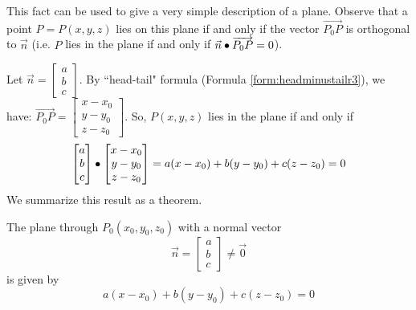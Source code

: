 \documentclass{ximera}
\begin{document}
 
This fact can be used to give a very simple description of a
plane.
 Observe that a point $P = P(x, y, z)$ lies on this plane if and only if the vector $\overrightarrow{P_{0}P}$ is orthogonal to $\vec{n}$ (i.e. $P$ lies in the plane if and only if $\vec{n} \bullet \overrightarrow{P_{0}P} = 0$).
  
 \begin{center}
           
\end{center}


  
Let $\vec{n}=\begin{bmatrix}a\\b\\c\end{bmatrix}$.  By ``head-tail" formula (Formula \ref{form:headminustailr3}), we have: $\overrightarrow{P_{0}P} = \begin{bmatrix}
x - x_{0}\\
y - y_{0}\\
z - z_{0}
\end{bmatrix}$. So, $P(x, y, z)$ lies in the plane if and only if
$$\begin{bmatrix}a\\b\\c\end{bmatrix}\bullet\begin{bmatrix}
x - x_{0}\\
y - y_{0}\\
z - z_{0}
\end{bmatrix}=a(x-x_0)+b(y-y_0)+c(z-z_0)=0$$
We summarize this result as a theorem.
 
\begin{theorem}\label{th:scalareqofplane}
The plane through $P_{0}(x_{0}, y_{0}, z_{0})$ with a normal vector $$\vec{n} =
\begin{bmatrix}
a\\
b\\
c
\end{bmatrix}\neq\vec{0}$$
 is given by
\begin{equation}\label{eq:plane}
a(x - x_{0}) + b(y - y_{0}) + c(z - z_{0}) = 0
\end{equation}
\end{theorem}
 
\end{document}
